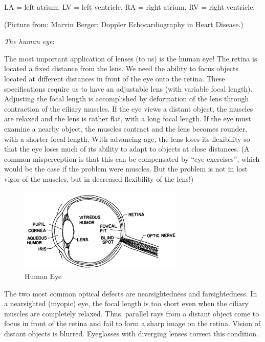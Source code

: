 LA = left atrium, LV = left ventricle, RA = right atrium, RV = right ventricle.\myskip

(Picture from: Marvin Berger: Doppler Echocardiography in Heart Disease.)\myskip

\noindent\emph{The human eye}:\vspace{0.6\baselineskip}

The most important application of lenses (to us) is the human eye! The retina is located a fixed distance from the lens. We need the ability to focus objects located at different distances in front of the eye onto the retina. These specifications require us to have an adjustable lens (with variable focal length). Adjusting the focal length is accomplished by deformation of the lens through contraction of the ciliary muscles. If the eye views a distant object, the muscles are relaxed and the lens is rather flat, with a long focal length. If the eye must examine a nearby object, the muscles contract and the lens becomes rounder, with a shorter focal length. With advancing age, the lens loses its flexibility so that the eye loses much of its ability to adapt to objects at close distances. (A common misperception is that this can be compensated by ``eye exercises'', which would be the case if the problem were muscles. But the problem is not in lost vigor of the muscles, but in decreased flexibility of the lens!)\myskip

\begin{figure}[!h]
\centering
\includegraphics[width=0.7\textwidth]{./Exp6/pic/image11.png}
\caption{Human Eye}
\end{figure} 

The two most common optical defects are nearsightedness and farsightedness. In a nearsighted (myopic) eye, the focal length is too short even when the ciliary muscles are completely relaxed. Thus, parallel rays from a distant object come to focus in front of the retina and fail to form a sharp image on the retina. Vision of distant objects is blurred. Eyeglasses with diverging lenses correct this condition. \myskip

